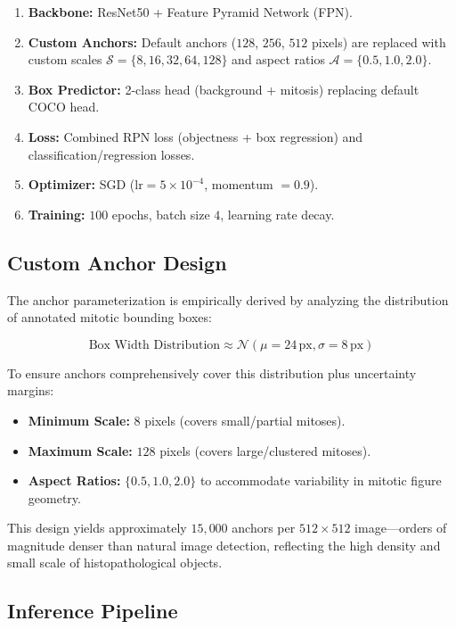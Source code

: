 \documentclass[journal]{IEEEtran}
\begin{document}
\begin{enumerate}
\item \textbf{Backbone:} ResNet50 + Feature Pyramid Network (FPN).
\item \textbf{Custom Anchors:} Default anchors ($128$, $256$, $512$ pixels) are replaced with custom scales $\mathcal{S} = \{8, 16, 32, 64, 128\}$ and aspect ratios $\mathcal{A} = \{0.5, 1.0, 2.0\}$.
\item \textbf{Box Predictor:} 2-class head (background + mitosis) replacing default COCO head.
\item \textbf{Loss:} Combined RPN loss (objectness + box regression) and classification/regression losses.
\item \textbf{Optimizer:} SGD ($\text{lr} = 5 \times 10^{-4}$, momentum $= 0.9$).
\item \textbf{Training:} $100$ epochs, batch size $4$, learning rate decay.
\end{enumerate}

\subsection{Custom Anchor Design}
The anchor parameterization is empirically derived by analyzing the distribution of annotated mitotic bounding boxes:

\begin{equation}
\text{Box Width Distribution} \approx \mathcal{N}(\mu=24\,\text{px}, \sigma=8\,\text{px})
\end{equation}

To ensure anchors comprehensively cover this distribution plus uncertainty margins:
\begin{itemize}
\item \textbf{Minimum Scale:} $8$ pixels (covers small/partial mitoses).
\item \textbf{Maximum Scale:} $128$ pixels (covers large/clustered mitoses).
\item \textbf{Aspect Ratios:} $\{0.5, 1.0, 2.0\}$ to accommodate variability in mitotic figure geometry.
\end{itemize}

This design yields approximately $15,000$ anchors per $512 \times 512$ image---orders of magnitude denser than natural image detection, reflecting the high density and small scale of histopathological objects.

\subsection{Inference Pipeline}
\end{document}
